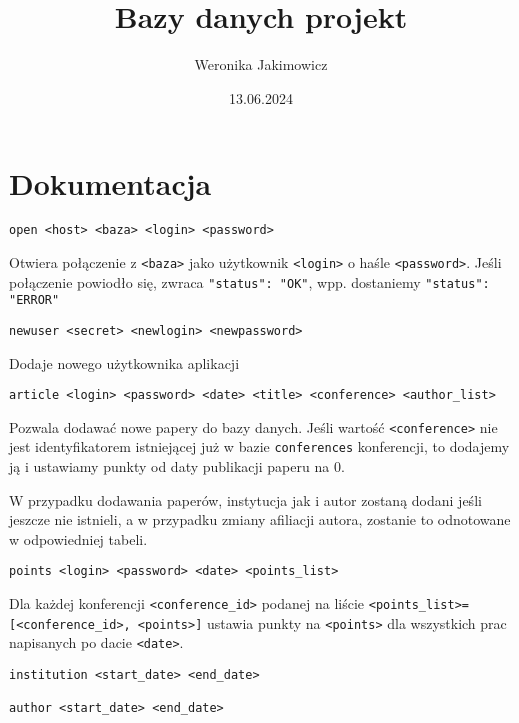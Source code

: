 \documentclass[12pt]{article}
\title{Bazy danych projekt}
\author{Weronika Jakimowicz}
\date{13.06.2024}
\def\inline{\lstinline[basicstyle=\ttfamily\large\color{orange!50!fg}]}
\begin{document}
\maketitle 

\section{Dokumentacja}

\begin{lstlisting}
open <host> <baza> <login> <password>
\end{lstlisting}

Otwiera połączenie z \inline{<baza>} jako użytkownik \inline{<login>} o haśle \inline{<password>}. Jeśli połączenie powiodło się, zwraca \inline{"status": "OK"}, wpp. dostaniemy \inline{"status": "ERROR"}

\begin{lstlisting}
newuser <secret> <newlogin> <newpassword>
\end{lstlisting}

Dodaje nowego użytkownika aplikacji

\begin{lstlisting}
article <login> <password> <date> <title> <conference> <author_list> 
\end{lstlisting}

Pozwala dodawać nowe papery do bazy danych. Jeśli wartość \inline{<conference>} nie jest identyfikatorem istniejącej już w bazie \inline{conferences} konferencji, to dodajemy ją i ustawiamy punkty od daty publikacji paperu na $0$. %

W przypadku dodawania paperów, instytucja jak i autor zostaną dodani jeśli jeszcze nie istnieli, a w przypadku zmiany afiliacji autora, zostanie to odnotowane w odpowiedniej tabeli.

\begin{lstlisting}
points <login> <password> <date> <points_list>
\end{lstlisting}

Dla każdej konferencji \inline{<conference_id>} podanej na liście \inline{<points_list>=[<conference_id>, <points>]} ustawia punkty na \inline{<points>} dla wszystkich prac napisanych po dacie \inline{<date>}.

\begin{lstlisting}
institution <start_date> <end_date>

author <start_date> <end_date>
\end{lstlisting}
\end{document}
